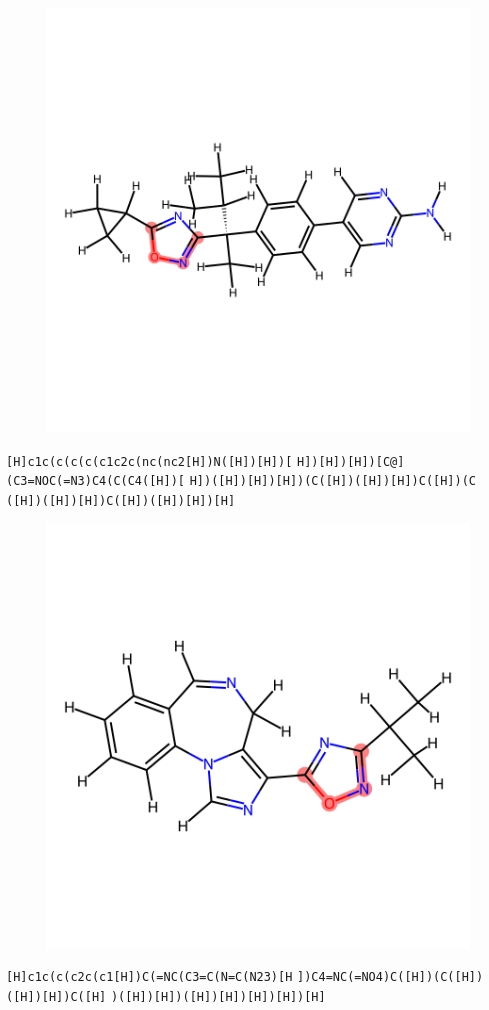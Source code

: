 \documentclass{article}
\begin{document}
\begin{figure}[ht]
\centering
    \includegraphics{mol248.png}
\end{figure}
\verb|[H]c1c(c(c(c(c1c2c(nc(nc2[H])N([H])[H])[| \verb|H])[H])[H])[C@](C3=NOC(=N3)C4(C(C4([H])[| \verb|H])([H])[H])[H])(C([H])([H])[H])C([H])(C| \verb|([H])([H])[H])C([H])([H])[H])[H]|

\begin{figure}[ht]
\centering
    \includegraphics{mol249.png}
\end{figure}
\verb|[H]c1c(c(c2c(c1[H])C(=NC(C3=C(N=C(N23)[H| \verb|])C4=NC(=NO4)C([H])(C([H])([H])[H])C([H]| \verb|)([H])[H])([H])[H])[H])[H])[H]|
\end{document}
